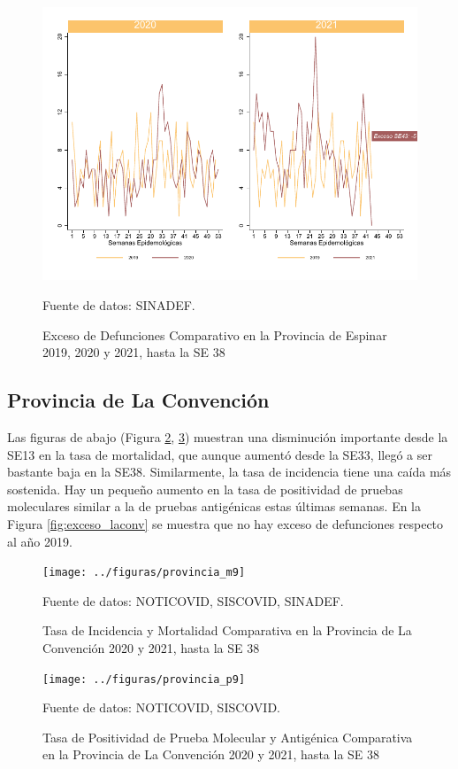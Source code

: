 \documentclass[12pt,a4paper,openany]{book}
\begin{document}
	\begin{figure}[h]
	\caption{Exceso de Defunciones Comparativo en la Provincia de Espinar 2019, 2020 y 2021, hasta la SE 38}\label{fig:exceso_espinar}
	\begin{center}
		\includegraphics[width=0.7\linewidth]{../figuras/exceso_8}
	\end{center}
	{\footnotesize {Fuente de datos: SINADEF.}}
	\end{figure}

\clearpage

	\subsection*{Provincia de La Convención}
	\noindent Las figuras de abajo (Figura \ref{fig:inc_mort_laconv}, \ref{fig:positividad_laconv})  muestran una disminución importante desde la SE13 en la tasa de mortalidad, que aunque aumentó desde la SE33, llegó a ser bastante baja en la SE38. Similarmente, la tasa de incidencia tiene una caída más sostenida. Hay un pequeño aumento en la tasa de positividad de pruebas moleculares similar a la de pruebas antigénicas estas últimas semanas. En la Figura \ref{fig:exceso_laconv} se muestra que no hay exceso de defunciones respecto al año 2019.

	\begin{figure}[h]
	\caption{Tasa de Incidencia y Mortalidad Comparativa en la Provincia de La Convención 2020 y 2021, hasta la SE 38}\label{fig:inc_mort_laconv}
	\begin{center}
		\texttt{[image: ../figuras/provincia\_m9]}
	\end{center}
	{\footnotesize {Fuente de datos: NOTICOVID, SISCOVID, SINADEF.}}
	\end{figure}

	\begin{figure}[h]
	\caption{Tasa de Positividad de Prueba Molecular y Antigénica Comparativa en la Provincia de La Convención 2020 y 2021, hasta la SE 38}\label{fig:positividad_laconv}
	\begin{center}
		\texttt{[image: ../figuras/provincia\_p9]}
	\end{center}
	{\footnotesize {Fuente de datos: NOTICOVID, SISCOVID.}}
	\end{figure}
\end{document}
